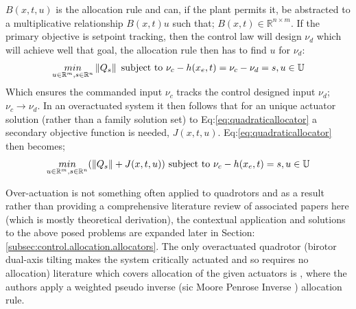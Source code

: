 $B(x,t,u)$ is the allocation rule and can, if the plant permits it, be abstracted to a multiplicative relationship $B(x,t)u$ such that; $B(x,t)\in\mathbb{R}^{n\times m}$. If the primary objective is setpoint tracking, then the control law will design $\nu_d$ which will achieve well that goal, the allocation rule then has to find $u$ for $\nu_d$:
\begin{equation}\label{eq:quadraticallocator}
\underset{u \in \mathbb{R}^m ,s \in \mathbb{R}^n}{min}\left\lVert Q_s\right\rVert ~\text{subject to} ~\nu_c - h(x_e,t)=\nu_c-\nu_d=s, u \in \mathbb{U}
\end{equation}
Which ensures the commanded input $\nu_c$ tracks the control designed input $\nu_d$; $\nu_c\rightarrow\nu_d$. In an overactuated system it then follows that for an unique actuator solution (rather than a family solution set) to Eq:\ref{eq:quadraticallocator} a secondary objective function is needed, $J(x,t,u)$. Eq:\ref{eq:quadraticallocator} then becomes;
\begin{equation}
\underset{u \in \mathbb{R}^m ,s \in \mathbb{R}^n}{min}(\left\lVert Q_s\right\rVert+J(x,t,u)) ~\text{subject to} ~\nu_c - h(x_e,t)=s, u \in \mathbb{U}
\end{equation}
\par
Over-actuation is not something often applied to quadrotors and as a result rather than providing a comprehensive literature review of associated papers here (which is mostly theoretical derivation), the contextual application and solutions to the above posed problems are expanded later in Section: \ref{subsec:control.allocation.allocators}. The only overactuated quadrotor (birotor dual-axis tilting makes the system critically actuated and so requires no allocation) literature which covers allocation of the given actuators is \cite{tiltgasco,tiltrihani}, where the authors apply a weighted pseudo inverse (sic Moore Penrose Inverse \cite{moorepenrose}) allocation rule.
